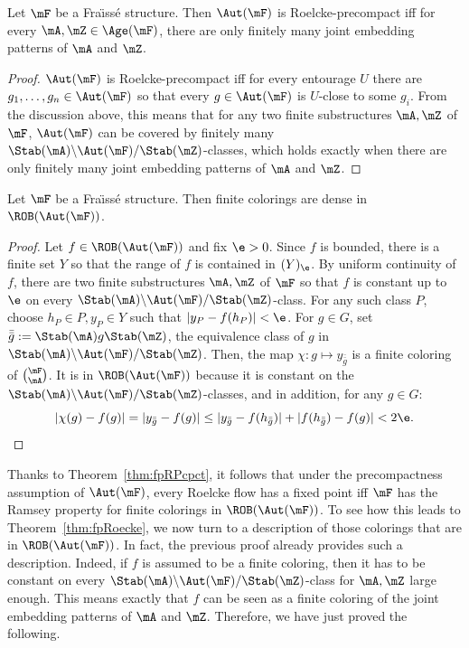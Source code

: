 \begin{prop}\label{prop:Roelcke-precompact}
Let $\mF$ be a Fra\"{\i}ss\'e structure. Then $\Aut(\mF)$ is Roelcke-precompact iff for every $\mA, \mZ \in \Age(\mF)$, there are only finitely many joint embedding patterns of $\mA$ and $\mZ$.
\end{prop}

\begin{proof}
$\Aut(\mF)$ is Roelcke-precompact iff for every entourage $U$ there are\linebreak $g_{1},\ldots,g_{n}\in \Aut(\mF)$ so that every $g\in \Aut(\mF)$ is $U$-close to some $g_{i}$. From the discussion above, this means that for any two finite substructures $\mA, \mZ$ of $\mF$, $\Aut(\mF)$ can be covered by finitely many $\Stab(\mA)\backslash \Aut(\mF)/\Stab(\mZ)$-classes, which holds exactly when there are only finitely many joint embedding patterns of $\mA$ and $\mZ$.
\end{proof}

\begin{prop}
Let $\mF$ be a Fra\"{\i}ss\'e structure. Then finite colorings are dense in $\ROB(\Aut(\mF))$.
\end{prop}

\begin{proof}
Let $f\in \ROB(\Aut(\mF))$ and fix $\e>0$. Since $f$ is bounded, there is a finite set $Y$ so that the range of $f$ is contained in $(Y)_\e$. By uniform continuity of $f$, there are two finite substructures $\mA, \mZ$ of $\mF$ so that $f$ is constant up to $\e$ on every $\Stab(\mA)\backslash \Aut(\mF)/\Stab(\mZ)$-class. For any such class $P$, choose $ h_P\in P, y_P \in Y$ such that $|y_P - f(h_P)|<\e$. For $g\in G$, set $\bar{\bar g}:= \Stab(\mA)g\Stab(\mZ)$, the equivalence class of $g$ in $\Stab(\mA)\backslash
\Aut(\mF)/\Stab(\mZ)$. Then, the map $\chi : g\mapsto y_{\bar{\bar g}}$ is a finite coloring of $\binom{\mF}{\mA}$. It is in $\ROB(\Aut(\mF))$ because it is constant on the $\Stab(\mA)\backslash \Aut(\mF)/\Stab(\mZ)$-classes, and in addition, for any $g\in G$:
\begin{equation*}
|\chi(g)-f(g)|=|y_{\bar{\bar g}} - f(g)|\leq |y_{\bar{\bar g}}-f(h_{\bar{\bar g}})|+ |f(h_{\bar{\bar g}})-f(g)|<2\e.
\qedhere
\end{equation*}
\end{proof}

Thanks to Theorem~\ref{thm:fpRPcpct}, it follows that under the precompactness assumption of $\Aut(\mF)$, every Roelcke flow has a fixed point iff $\mF$ has the Ramsey property for finite colorings in $\ROB(\Aut(\mF))$. To see how this leads to Theorem~\ref{thm:fpRoecke}, we now turn to a description of those colorings that are in $\ROB(\Aut(\mF))$. In fact, the previous proof already provides such a description. Indeed, if $f$ is assumed to be a finite coloring, then it has to be constant on every $\Stab(\mA)\backslash \Aut(\mF)/\Stab(\mZ)$-class for $\mA, \mZ$ large enough. This means exactly that $f$ can be seen as a finite coloring of the joint embedding patterns of $\mA$ and $\mZ$. Therefore, we have just proved the following.

